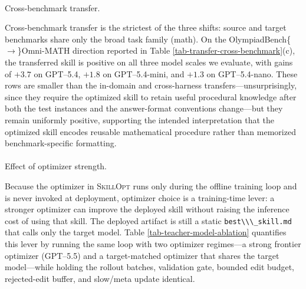 \documentclass[
]{article}
\makeatletter
\let\oldparagraph\paragraph
\renewcommand{\paragraph}{
    \@ifstar
      \xxxParagraphStar
      \xxxParagraphNoStar
  }
\newcommand{\xxxParagraphStar}[1]{\oldparagraph*{#1}\mbox{}}
\newcommand{\xxxParagraphNoStar}[1]{\oldparagraph{#1}\mbox{}}
\newcommand{\passthrough}[1]{#1}
\newcommand{\ourmethod}{\textsc{SkillOpt}\xspace}
\makeatother
\begin{document}
\paragraph{Cross-benchmark transfer.}\label{cross-benchmark-transfer.}

Cross-benchmark transfer is the strictest of the three shifts: source
and target benchmarks share only the broad task family (math). On the
OlympiadBench\{\(\to\)\}Omni-MATH direction reported in Table
\ref{tab-transfer-cross-benchmark}(c), the transferred skill is positive
on all three model scales we evaluate, with gains of \(+3.7\) on
GPT--5.4, \(+1.8\) on GPT--5.4-mini, and \(+1.3\) on GPT--5.4-nano.
These rows are smaller than the in-domain and cross-harness
transfers---unsurprisingly, since they require the optimized skill to
retain useful procedural knowledge after both the test instances and the
answer-format conventions change---but they remain uniformly positive,
supporting the intended interpretation that the optimized skill encodes
reusable mathematical procedure rather than memorized benchmark-specific
formatting.

\paragraph{Effect of optimizer
strength.}\label{effect-of-optimizer-strength.}

Because the optimizer in \ourmethod{} runs only during the offline
training loop and is never invoked at deployment, optimizer choice is a
training-time lever: a stronger optimizer can improve the deployed skill
without raising the inference cost of using that skill. The deployed
artifact is still a static \passthrough{\lstinline!best\\\_skill.md!}
that calls only the target model. Table \ref{tab-teacher-model-ablation}
quantifies this lever by running the same loop with two optimizer
regimes---a strong frontier optimizer (GPT--5.5) and a target-matched
optimizer that shares the target model---while holding the rollout
batches, validation gate, bounded edit budget, rejected-edit buffer, and
slow/meta update identical.
\end{document}
